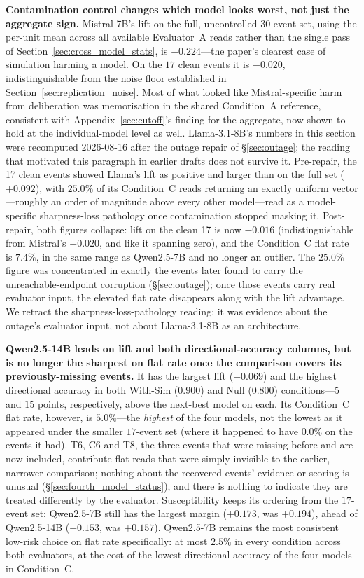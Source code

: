 \documentclass[11pt,journal,onecolumn]{IEEEtran}
\begin{document}
\textbf{Contamination control changes which model looks worst, not just the aggregate sign.} Mistral-7B's lift on the full, uncontrolled $30$-event set, using the per-unit mean across all available Evaluator~A reads rather than the single pass of Section~\ref{sec:cross_model_stats}, is $-0.224$---the paper's clearest case of simulation harming a model. On the $17$ clean events it is $-0.020$, indistinguishable from the noise floor established in Section~\ref{sec:replication_noise}. Most of what looked like Mistral-specific harm from deliberation was memorisation in the shared Condition~A reference, consistent with Appendix~\ref{sec:cutoff}'s finding for the aggregate, now shown to hold at the individual-model level as well. Llama-3.1-8B's numbers in this section were recomputed 2026-08-16 after the outage repair of \S\ref{sec:outage}; the reading that motivated this paragraph in earlier drafts does not survive it. Pre-repair, the 17 clean events showed Llama's lift as positive and larger than on the full set ($+0.092$), with $25.0\%$ of its Condition~C reads returning an exactly uniform vector---roughly an order of magnitude above every other model---read as a model-specific sharpness-loss pathology once contamination stopped masking it. Post-repair, both figures collapse: lift on the clean 17 is now $-0.016$ (indistinguishable from Mistral's $-0.020$, and like it spanning zero), and the Condition~C flat rate is $7.4\%$, in the same range as Qwen2.5-7B and no longer an outlier. The $25.0\%$ figure was concentrated in exactly the events later found to carry the unreachable-endpoint corruption (\S\ref{sec:outage}); once those events carry real evaluator input, the elevated flat rate disappears along with the lift advantage. We retract the sharpness-loss-pathology reading: it was evidence about the outage's evaluator input, not about Llama-3.1-8B as an architecture.

\textbf{Qwen2.5-14B leads on lift and both directional-accuracy columns, but is no longer the sharpest on flat rate once the comparison covers its previously-missing events.} It has the largest lift ($+0.069$) and the highest directional accuracy in both With-Sim ($0.900$) and Null ($0.800$) conditions---$5$ and $15$ points, respectively, above the next-best model on each. Its Condition~C flat rate, however, is $5.0\%$---the \emph{highest} of the four models, not the lowest as it appeared under the smaller $17$-event set (where it happened to have $0.0\%$ on the events it had). T6, C6 and T8, the three events that were missing before and are now included, contribute flat reads that were simply invisible to the earlier, narrower comparison; nothing about the recovered events' evidence or scoring is unusual (\S\ref{sec:fourth_model_status}), and there is nothing to indicate they are treated differently by the evaluator. Susceptibility keeps its ordering from the $17$-event set: Qwen2.5-7B still has the largest margin ($+0.173$, was $+0.194$), ahead of Qwen2.5-14B ($+0.153$, was $+0.157$). Qwen2.5-7B remains the most consistent low-risk choice on flat rate specifically: at most $2.5\%$ in every condition across both evaluators, at the cost of the lowest directional accuracy of the four models in Condition~C.
\end{document}
